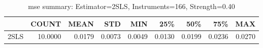 \begin{table}[ht]
\centering
\caption{mse summary: Estimator=2SLS, Instruments=166, Strength=0.40}
\begin{tabular}{lrrrrrrrr}
\toprule
 & COUNT & MEAN & STD & MIN & 25\% & 50\% & 75\% & MAX \\
\midrule
2SLS & 10.0000 & 0.0179 & 0.0073 & 0.0049 & 0.0130 & 0.0199 & 0.0236 & 0.0270 \\
\bottomrule
\end{tabular}
\end{table}
